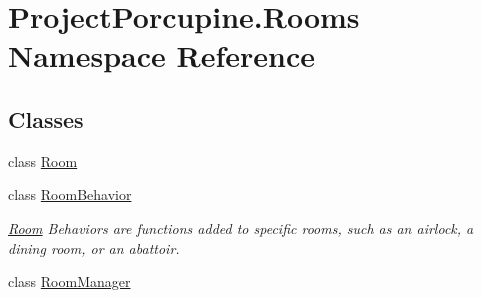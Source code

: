 \hypertarget{namespace_project_porcupine_1_1_rooms}{}\section{Project\+Porcupine.\+Rooms Namespace Reference}
\label{namespace_project_porcupine_1_1_rooms}
\subsection*{Classes}
\begin{DoxyCompactItemize}
\item 
class \hyperlink{class_project_porcupine_1_1_rooms_1_1_room}{Room}
\item 
class \hyperlink{class_project_porcupine_1_1_rooms_1_1_room_behavior}{Room\+Behavior}
\begin{DoxyCompactList}\small\item\em \hyperlink{class_project_porcupine_1_1_rooms_1_1_room}{Room} Behaviors are functions added to specific rooms, such as an airlock, a dining room, or an abattoir. \end{DoxyCompactList}\item 
class \hyperlink{class_project_porcupine_1_1_rooms_1_1_room_manager}{Room\+Manager}
\end{DoxyCompactItemize}
